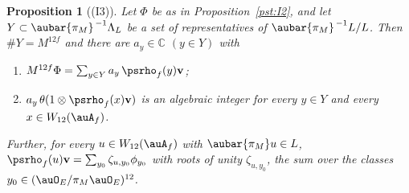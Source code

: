 \documentclass[10pt]{amsart}
\newtheorem{proposition}[theorem]{Proposition}
\theoremstyle{definition}
\theoremstyle{remark}
\newcommand{\C}{\mathbb C}
\providecommand{\psvac}{\mathbf v}
\begin{document}
\begin{proposition}[(I3)]\label{pst:I3}
Let $\Phi$ be as in Proposition~\ref{pst:I2}, and let $Y\subset\aubar{\pi_M}^{\,-1}\Lambda_L$ be a
set of representatives of $\aubar{\pi_M}^{\,-1}L/L$. Then $\#Y=M^{12f}$ and there are $a_y\in\C$
$(y\in Y)$ with
\begin{enumerate}
\item[(a)] $M^{12f}\Phi=\sum_{y\in Y}a_y\,\psrho_f(y)\psvac$;
\item[(b)] $a_y\,\theta(1\otimes\psrho_f(x)\psvac)$ is an algebraic integer for every $y\in Y$ and
every $x\in W_{12}(\auA_f)$.
\end{enumerate}
Further, for every $u\in W_{12}(\auA_f)$ with $\aubar{\pi_M}u\in L$, $\psrho_f(u)\psvac=\sum_{y_0}
\zeta_{u,y_0}\phi_{y_0}$ with roots of unity $\zeta_{u,y_0}$, the sum over the classes $y_0\in
(\auO_E/\pi_M\auO_E)^{12}$.
\end{proposition}
\end{document}
